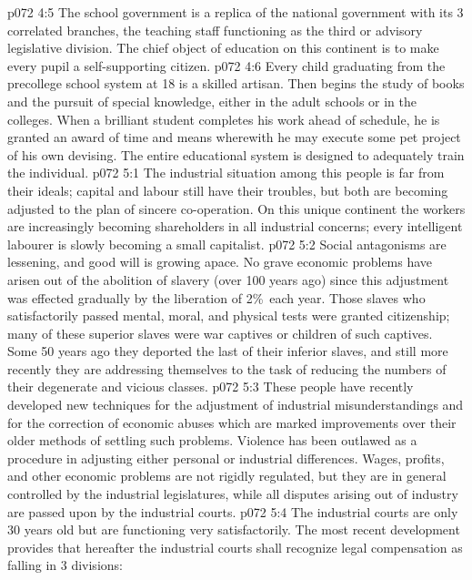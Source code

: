 \vs p072 4:5 The school government is a replica of the national government with its 3 correlated branches, the teaching staff functioning as the third or advisory legislative division. The chief object of education on this continent is to make every pupil a self\hyp{}supporting citizen.
\vs p072 4:6 Every child graduating from the precollege school system at 18 is a skilled artisan. Then begins the study of books and the pursuit of special knowledge, either in the adult schools or in the colleges. When a brilliant student completes his work ahead of schedule, he is granted an award of time and means wherewith he may execute some pet project of his own devising. The entire educational system is designed to adequately train the individual.
\vs p072 5:1 The industrial situation among this people is far from their ideals; capital and labour still have their troubles, but both are becoming adjusted to the plan of sincere co\hyp{}operation. On this unique continent the workers are increasingly becoming shareholders in all industrial concerns; every intelligent labourer is slowly becoming a small capitalist.
\vs p072 5:2 Social antagonisms are lessening, and good will is growing apace. No grave economic problems have arisen out of the abolition of slavery (over 100 years ago) since this adjustment was effected gradually by the liberation of 2\%\ each year. Those slaves who satisfactorily passed mental, moral, and physical tests were granted citizenship; many of these superior slaves were war captives or children of such captives. Some 50 years ago they deported the last of their inferior slaves, and still more recently they are addressing themselves to the task of reducing the numbers of their degenerate and vicious classes.
\vs p072 5:3 \pc These people have recently developed new techniques for the adjustment of industrial misunderstandings and for the correction of economic abuses which are marked improvements over their older methods of settling such problems. Violence has been outlawed as a procedure in adjusting either personal or industrial differences. Wages, profits, and other economic problems are not rigidly regulated, but they are in general controlled by the industrial legislatures, while all disputes arising out of industry are passed upon by the industrial courts.
\vs p072 5:4 The industrial courts are only 30 years old but are functioning very satisfactorily. The most recent development provides that hereafter the industrial courts shall recognize legal compensation as falling in 3 divisions:
